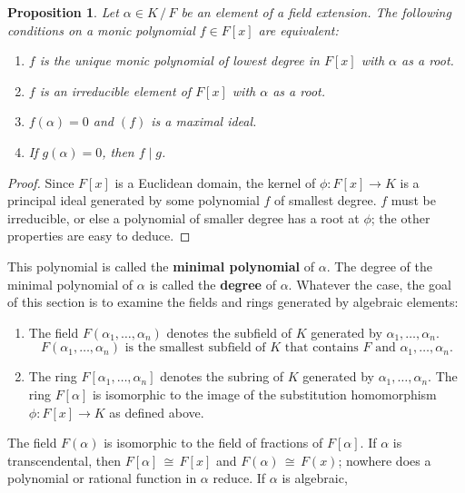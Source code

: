 \documentclass[11pt]{article}
\newtheorem{proposition}{Proposition}
\begin{document}
\begin{adjustwidth}{0.5cm}{}
  \begin{proposition}
    Let $\alpha \in K \, / \, F$ be an element of a field extension. The following conditions on a monic polynomial $f \in F[x]$ are equivalent:
    \begin{enumerate}
      \item $f$ is the unique monic polynomial of lowest degree in $F[x]$ with $\alpha$ as a root.
      \item $f$ is an irreducible element of $F[x]$ with $\alpha$ as a root.
      \item $f(\alpha) = 0$ and $(f)$ is a maximal ideal.
      \item If $g(\alpha) = 0$, then $f \mid g$.
    \end{enumerate}
  \end{proposition}
  \begin{proof}
    Since $F[x]$ is a Euclidean domain, the kernel of $\phi : F[x] \to K$ is a principal ideal generated by some polynomial $f$ of smallest degree. $f$ must be irreducible, or else a polynomial of smaller degree has a root at $\phi$; the other properties are easy to deduce.
  \end{proof}
\end{adjustwidth}
This polynomial is called the \textbf{minimal polynomial} of $\alpha$. The degree of the minimal polynomial of $\alpha$ is called the \textbf{degree} of $\alpha$. Whatever the case, the goal of this section is to examine the fields and rings generated by algebraic elements:

\begin{enumerate}
  \item The field $F(\alpha_{1}, \ldots, \alpha_{n})$ denotes the subfield of $K$ generated by $\alpha_{1}, \ldots, \alpha_{n}$.
  \[
    \text{$F(\alpha_{1}, \ldots, \alpha_{n})$ is the smallest subfield of $K$ that contains $F$ and $\alpha_{1}, \ldots, \alpha_{n}$}.
  \]
  \item The ring $F[\alpha_{1}, \ldots, \alpha_{n}]$ denotes the subring of $K$ generated by $\alpha_{1}, \ldots, \alpha_{n}$. The ring $F[\alpha]$ is isomorphic to the image of the substitution homomorphism $\phi : F[x] \to K$ as defined above.
\end{enumerate}

The field $F(\alpha)$ is isomorphic to the field of fractions of $F[\alpha]$. If $\alpha$ is transcendental, then $F[\alpha] \, \cong \, F[x]$ and $F(\alpha) \, \cong \, F(x)$; nowhere does a polynomial or rational function in $\alpha$ reduce. If $\alpha$ is algebraic,
\end{document}
